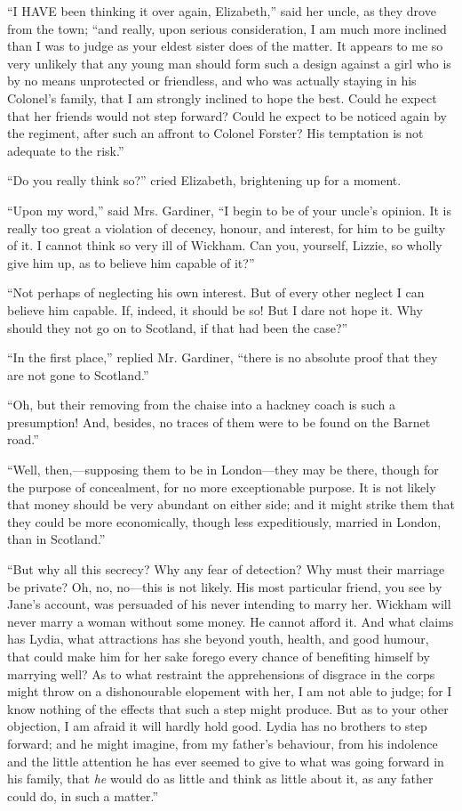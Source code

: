 \documentclass[12pt,openright]{book}
\begin{document}
\noindent  “I HAVE been thinking it over again, Elizabeth,” said her uncle, as they drove from the town; “and really, upon serious consideration, I am much more inclined than I was to judge as your eldest sister does of the matter. It appears to me so very unlikely that any young man should form such a design against a girl who is by no means unprotected or friendless, and who was actually staying in his Colonel’s family, that I am strongly inclined to hope the best. Could he expect that her friends would not step forward? Could he expect to be noticed again by the regiment, after such an affront to Colonel Forster? His temptation is not adequate to the risk.”

“Do you really think so?” cried Elizabeth, brightening up for a moment.

“Upon my word,” said Mrs. Gardiner, “I begin to be of your uncle’s opinion. It is really too great a violation of decency, honour, and interest, for him to be guilty of it. I cannot think so very ill of Wickham. Can you, yourself, Lizzie, so wholly give him up, as to believe him capable of it?”

“Not perhaps of neglecting his own interest. But of every other neglect I can believe him capable. If, indeed, it should be so! But I dare not hope it. Why should they not go on to Scotland, if that had been the case?”

“In the first place,” replied Mr. Gardiner, “there is no absolute proof that they are not gone to Scotland.”

“Oh, but their removing from the chaise into a hackney coach is such a presumption! And, besides, no traces of them were to be found on the Barnet road.”

“Well, then,—supposing them to be in London—they may be there, though for the purpose of concealment, for no more exceptionable purpose. It is not likely that money should be very abundant on either side; and it might strike them that they could be more economically, though less expeditiously, married in London, than in Scotland.”

“But why all this secrecy? Why any fear of detection? Why must their marriage be private? Oh, no, no—this is not likely. His most particular friend, you see by Jane’s account, was persuaded of his never intending to marry her. Wickham will never marry a woman without some money. He cannot afford it. And what claims has Lydia, what attractions has she beyond youth, health, and good humour, that could make him for her sake forego every chance of benefiting himself by marrying well? As to what restraint the apprehensions of disgrace in the corps might throw on a dishonourable elopement with her, I am not able to judge; for I know nothing of the effects that such a step might produce. But as to your other objection, I am afraid it will hardly hold good. Lydia has no brothers to step forward; and he might imagine, from my father’s behaviour, from his indolence and the little attention he has ever seemed to give to what was going forward in his family, that \textit{he} would do as little and think as little about it, as any father could do, in such a matter.”
\end{document}
